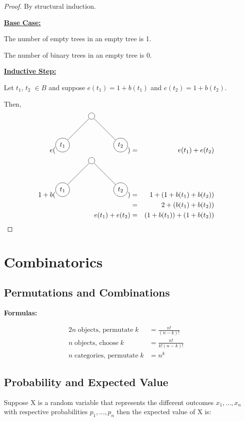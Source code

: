\documentclass{article}
\begin{document}
\begin{proof}
By structural induction.

\underline{\textbf{Base Case:}}

The number of empty trees in an empty tree is 1. \checkmark

The number of binary trees in an empty tree is 0. \checkmark

\underline{\textbf{Inductive Step:}}

Let $ t_1 $, $ t_2 $ $ \in B $ and suppose $ e(t_1) = 1 + b(t_1) $ and $ e(t_2) = 1 + b(t_2) $.

Then, 
\begin{alignat*}{2}
e( 
\begin{tikzpicture}[
  every node/.style={circle, draw},
  level/.style={sibling distance=30mm/#1}
]
  \node {}
    child {node {$t_1$}
  }
    child {node {$t_2$}
  };
\end{tikzpicture}
) &=& e(t_1) + e(t_2)
\\
1 + b( \begin{tikzpicture}[
  every node/.style={circle, draw},
  level/.style={sibling distance=30mm/#1}
]
  \node {}
    child {node {$t_1$}
  }
    child {node {$t_2$}
  };
\end{tikzpicture}
)
&=& 1 + (1 + b(t_1) + b(t_2))
\\
&=& 2 + (b(t_1) + b(t_2))
\\
e(t_1) + e(t_2) &=& (1 + b(t_1)) + (1 + b(t_2)) 
\end{alignat*}
\end{proof}
\clearpage

\section{Combinatorics}
\subsection{Permutations and Combinations}
\textbf{Formulas:}

\begin{alignat*}{2}
  n\;\text{objects, permutate} \;k &= \frac{n!}{(n-k)!} \\
  n\;\text{objects, choose}\; k &= \frac{n!}{k!{(n-k)}!} \\
  n\;\text{categories, permutate} \;k &= n^k 
\end{alignat*}

\subsection{Probability and Expected Value}
Suppose X is a random variable that represents the different outcomes $ x_1, ..., x_n $ with respective
probabilities $p_1, ..., p_n$ then the expected value of X is:
\end{document}
